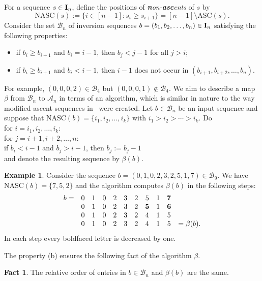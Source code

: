 \documentclass[12pt]{amsart}
\theoremstyle{plain}
\theoremstyle{definition}
\newtheorem{fact}{Fact}
\theoremstyle{example}
\newtheorem{example}{Example}
\theoremstyle{remark}
\numberwithin{equation}{section}
\numberwithin{figure}{section}
\def\I{\operatorname{{\bf I}}}
\def\B{ \mathcal{B}}
\def\ASC{\mathrm{ASC}}
\def\NASC{\mathrm{NASC}}
\begin{document}
For a sequence  $s\in\I_n$, define the positions of {\em {\bf\em n}on-{\bf\em asc}ents} of $s$ by
 $$
 \NASC(s):=\{i\in[n-1]: s_i\geq s_{i+1}\}=[n-1]\setminus\ASC(s).
 $$
Consider  the set $\B_n$  of  inversion sequences $b=(b_1,b_2,\ldots,b_n)\in\I_n$  satisfying the  following properties:
\begin{itemize}
\item[(a)]   if $b_i\geq b_{i+1}$ and $b_i=i-1$, then $b_j< j-1$ for all $j>i$;
\item[(b)]  if $b_i\geq b_{i+1}$ and $b_i<i-1$, then $i-1$ does not occur in  $(b_{i+1},b_{i+2},\ldots, b_{n})$.
\end{itemize}
For example, $(0,0,0,2)\in\B_4$ but $(0,0,0,1)\notin\B_4$.
We  aim to describe a map $\beta$ from $\mathcal{B}_n$ to $\mathcal{A}_n$ in   terms of an algorithm, which is similar in nature to the way modified ascent sequences in~\cite{bcdk} were created.   Let $b\in\B_n$ be an input sequence and suppose that $\NASC(b)=\{i_1, i_2, \ldots , i_k\}$ with $i_1>i_2>\cdots > i_k$. Do \\
\hspace*{0.5cm}  for $i=i_1,i_2,\ldots, i_k$:\\
\hspace*{1cm}  for $j=i+1, i+2, \ldots, n$:\\
 \hspace*{1.5cm}  if $b_i<i-1$ and $b_j>i-1$, then $b_j:=b_j-1$\\
and denote the resulting sequence by $\beta(b)$.
\begin{example}
Consider the sequence $b=(0,1,0,2,3,2,5,1,7)\in\B_9$. We have $\NASC(b)=\{7,5,2\}$  and the algorithm computes $\beta(b)$ in the following steps:
$$
\begin{array}{ccccccccccc}
b=&0&1&0&2&3&2&5&1&\bf{7}&\\
&0&1&0&2&3&2&\bf{5}&1&\bf{6}&\\
&0&1&0&2&3&2&4&1&5&\\
&0&1&0&2&3&2&4&1&5&=\beta(b).\\
\end{array}
$$
In each step every   boldfaced letter is decreased by
  one.
\end{example}

The property (b) ensures the following fact of the algorithm $\beta$.
\begin{fact}\label{beta:fact}
The relative order of entries in $b\in\B_n$ and $\beta(b)$ are the same.
\end{fact}
\end{document}
